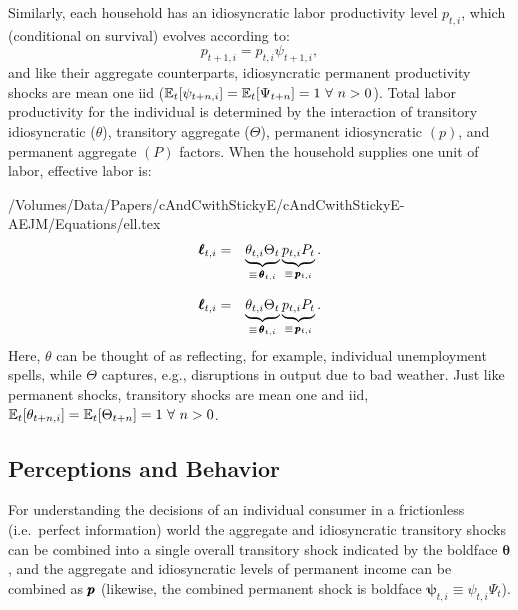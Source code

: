 \documentclass[titlepage]{./econtex}
\begin{document}
Similarly, each household has an idiosyncratic labor productivity level $p_{t,i}$, which (conditional on survival) evolves according to:
\begin{equation}
p_{t+1,i} = p_{t,i} \psi_{t+1,i},  \label{eq:IndRandWalk}
\end{equation}
and like their aggregate counterparts, idiosyncratic permanent productivity shocks are mean
one iid ($\operatorname{\mathbb{E}}_{t}[\psi_{t+n,i}]=\operatorname{\mathbb{E}}_{t}[\Psi_{t+n}]= 1~\forall ~n>0$).
Total labor productivity for the individual is determined by the interaction of transitory idiosyncratic
($\theta$), transitory aggregate ($\Theta$), permanent idiosyncratic $({p})$, and permanent aggregate
$({P})$ factors.  When the household supplies one unit of labor, effective labor is:
\begin{verbatimwrite}{/Volumes/Data/Papers/cAndCwithStickyE/cAndCwithStickyE-AEJM/Equations/ell.tex}
\begin{eqnarray}
  \label{eq:ell}
   \pmb{\ell}_{t,i} & = & \underbrace{\theta_{t,i}\Theta_{t}}_{\equiv\,\pmb{\theta}_{t,i}}\underbrace{{p}_{t,i} {P}_{t}}_{\equiv\,\pmb{p}_{t,i}}.
\end{eqnarray}
\end{verbatimwrite}
\begin{eqnarray}
  \label{eq:ell}
   \pmb{\ell}_{t,i} & = & \underbrace{\theta_{t,i}\Theta_{t}}_{\equiv\,\pmb{\theta}_{t,i}}\underbrace{{p}_{t,i} {P}_{t}}_{\equiv\,\pmb{p}_{t,i}}.
\end{eqnarray}
  Here, $\theta$ can be thought of as reflecting, for example, individual unemployment spells, while $\Theta$ captures, e.g., disruptions in output due to bad weather.  Just like permanent shocks, transitory shocks are mean one and iid, $\operatorname{\mathbb{E}}_{t}[\theta_{t+n,i}]=\operatorname{\mathbb{E}}_{t}[\Theta_{t+n}]=1~\forall~n>0$.  


\subsection{Perceptions and Behavior}

For understanding the decisions of an individual consumer in a frictionless (i.e.\ perfect information) world the aggregate and idiosyncratic transitory shocks can be combined into a single overall transitory shock indicated by the boldface $\pmb{\theta}$, and the aggregate and idiosyncratic levels of permanent income can be combined as $\pmb{p}$ (likewise, the combined permanent shock is boldface $\pmb{\psi}_{t,i}\equiv \psi_{t,i} \Psi_{t}$).
\end{document}
